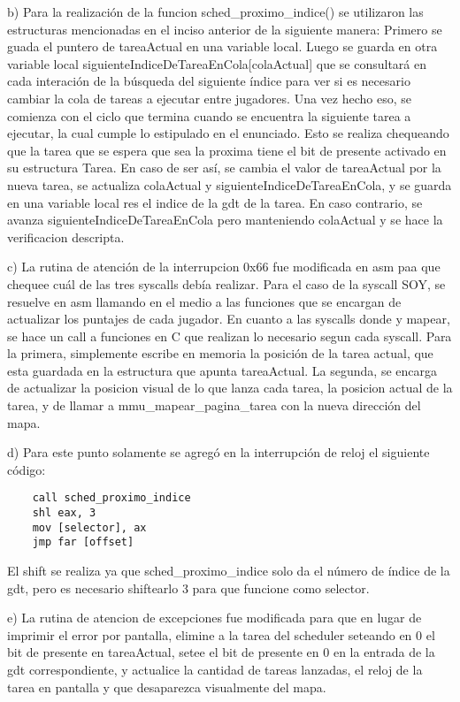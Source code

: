\documentclass[a4paper]{article}
\begin{document}
b) Para la realización de la funcion sched_proximo_indice() se utilizaron las estructuras mencionadas en el inciso anterior de la siguiente manera:
Primero se guada el puntero de tareaActual en una variable local. Luego se guarda en otra variable local siguienteIndiceDeTareaEnCola[colaActual] que se consultará en cada interación de la búsqueda del
siguiente índice para ver si es necesario cambiar la cola de tareas a ejecutar entre jugadores. Una vez hecho eso, se comienza con el ciclo que termina cuando se encuentra
la siguiente tarea a ejecutar, la cual cumple lo estipulado en el enunciado. Esto se realiza chequeando que la tarea que se espera que sea la proxima tiene el bit de presente
activado en su estructura Tarea. En caso de ser así, se cambia el valor de tareaActual por la nueva tarea, se actualiza colaActual y siguienteIndiceDeTareaEnCola, y se guarda en una variable local res
el indice de la gdt de la tarea. En caso contrario, se avanza siguienteIndiceDeTareaEnCola pero manteniendo colaActual y se hace la verificacion descripta.

c) La rutina de atención de la interrupcion 0x66 fue modificada en asm paa que chequee cuál de las tres syscalls debía realizar. Para el caso de la syscall SOY, se resuelve en asm llamando en el medio a las funciones
que se encargan de actualizar los puntajes de cada jugador. En cuanto a las syscalls donde y mapear, se hace un call a funciones en C que realizan lo necesario segun cada syscall. Para
la primera, simplemente escribe en memoria la posición de la tarea actual, que esta guardada en la estructura que apunta tareaActual. La segunda, se encarga de actualizar la posicion visual de lo que lanza cada tarea,
la posicion actual de la tarea, y de llamar a mmu_mapear_pagina_tarea con la nueva dirección del mapa.

d) Para este punto solamente se agregó en la interrupción de reloj el siguiente código:
\begin{verbatim}
	call sched_proximo_indice
	shl eax, 3
	mov [selector], ax
	jmp far [offset]
\end{verbatim}
El shift se realiza ya que sched_proximo_indice solo da el número de índice de la gdt, pero es necesario shiftearlo 3 para que funcione como selector.

e) La rutina de atencion de excepciones fue modificada para que en lugar de imprimir el error por pantalla, elimine a la tarea del scheduler seteando en 0 el bit de presente
en tareaActual, setee el bit de presente en 0 en la entrada de la gdt correspondiente, y actualice la cantidad de tareas lanzadas, el reloj de la tarea en pantalla y que desaparezca visualmente del mapa.
\end{document}
